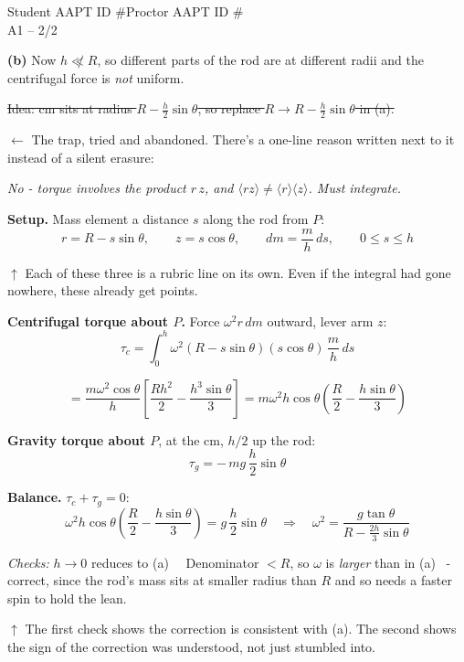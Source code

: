 \documentclass[11pt]{article}
\newcommand{\ann}[1]{{\color{gradered}\sffamily\footnotesize #1}}
\begin{document}
\begin{sheet}{Student AAPT ID \#\qquad Proctor AAPT ID \#\\ A1 -- 2/2}

\textbf{(b)} \quad Now $h \not\ll R$, so different parts of the rod are at different radii
and the centrifugal force is \emph{not} uniform.

\medskip
\sout{Idea: cm sits at radius $R - \tfrac{h}{2}\sin\theta$, so replace $R \to R -
\tfrac{h}{2}\sin\theta$ in (a).}

\ann{$\leftarrow$ The trap, tried and abandoned. There's a one-line reason written next to
it instead of a silent erasure:}

\smallskip
\emph{No - torque involves the product $r\,z$, and $\langle rz\rangle \neq \langle r
\rangle\langle z\rangle$. Must integrate.}

\medskip
\textbf{Setup.} Mass element a distance $s$ along the rod from $P$:
\[ r = R - s\sin\theta, \qquad z = s\cos\theta, \qquad dm = \frac{m}{h}\,ds,
\qquad 0 \le s \le h \]

\ann{$\uparrow$ Each of these three is a rubric line on its own. Even if the integral had
gone nowhere, these already get points.}

\medskip
\textbf{Centrifugal torque about $P$.} Force $\omega^2 r\,dm$ outward, lever arm $z$:
\[ \tau_c = \int_0^h \omega^2 (R - s\sin\theta)(s\cos\theta)\,\frac{m}{h}\,ds \]

\[ = \frac{m\omega^2\cos\theta}{h}\left[ \frac{Rh^2}{2} - \frac{h^3\sin\theta}{3} \right]
 = m\omega^2 h\cos\theta \left( \frac{R}{2} - \frac{h\sin\theta}{3} \right) \]

\textbf{Gravity torque about $P$}, at the cm, $h/2$ up the rod:
\[ \tau_g = -\,mg\,\frac{h}{2}\sin\theta \]

\textbf{Balance.} $\tau_c + \tau_g = 0$:
\[ \omega^2 h\cos\theta\left( \frac{R}{2} - \frac{h\sin\theta}{3}\right)
   = g\,\frac{h}{2}\sin\theta
   \quad\Longrightarrow\quad
   \omega^2 = \frac{g\tan\theta}{R - \tfrac{2h}{3}\sin\theta} \]

\medskip
{}

\medskip
\emph{Checks:} $h \to 0$ reduces to (a) \checkmark\ \ Denominator $< R$, so $\omega$ is
\emph{larger} than in (a) \checkmark\ - correct, since the rod's mass sits at smaller
radius than $R$ and so needs a faster spin to hold the lean.

\ann{$\uparrow$ The first check shows the correction is consistent with (a). The second
shows the sign of the correction was understood, not just stumbled into.}

\end{sheet}
\end{document}
